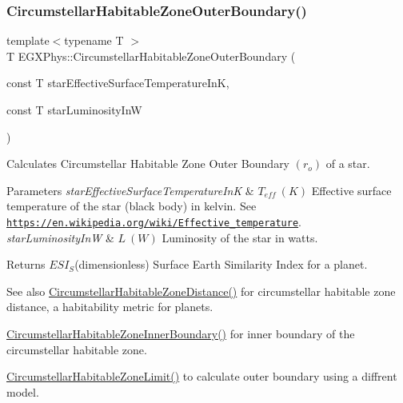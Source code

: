 \subsubsection{\texorpdfstring{Circumstellar\+Habitable\+Zone\+Outer\+Boundary()}{CircumstellarHabitableZoneOuterBoundary()}}
{\footnotesize\ttfamily template$<$typename T $>$ \\
T E\+G\+X\+Phys\+::\+Circumstellar\+Habitable\+Zone\+Outer\+Boundary (\begin{DoxyParamCaption}\item[{const T}]{star\+Effective\+Surface\+Temperature\+InK,  }\item[{const T}]{star\+Luminosity\+InW }\end{DoxyParamCaption})}



Calculates Circumstellar Habitable Zone Outer Boundary $(r_o)$ of a star. 


\begin{DoxyParams}{Parameters}
{\em star\+Effective\+Surface\+Temperature\+InK} & $T_{eff}\ (K)$ Effective surface temperature of the star (black body) in kelvin. See \href{https://en.wikipedia.org/wiki/Effective_temperature}{\tt https\+://en.\+wikipedia.\+org/wiki/\+Effective\+\_\+temperature}. \\
\hline
{\em star\+Luminosity\+InW} & $L\ (W)$ Luminosity of the star in watts. \\
\hline
\end{DoxyParams}
\begin{DoxyReturn}{Returns}
$ESI_S$(dimensionless) Surface Earth Similarity Index for a planet. 
\end{DoxyReturn}
\begin{DoxySeeAlso}{See also}
\mbox{\hyperlink{group___e_g_x_phys-_circumstellar_habitable_zone_limit_gaf289fb8f037ece66d850f7d827f83752}{Circumstellar\+Habitable\+Zone\+Distance()}} for circumstellar habitable zone distance, a habitability metric for planets. 

\mbox{\hyperlink{group___e_g_x_phys-_circumstellar_habitable_zone_limit_gab31a33d0dbd3ecd00537832b5b836d73}{Circumstellar\+Habitable\+Zone\+Inner\+Boundary()}} for inner boundary of the circumstellar habitable zone. 

\mbox{\hyperlink{group___e_g_x_phys-_circumstellar_habitable_zone_limit_ga809f4c557ce6d2fe566a69c2a8a5d41b}{Circumstellar\+Habitable\+Zone\+Limit()}} to calculate outer boundary using a diffrent model. 
\end{DoxySeeAlso}
\mbox{\label{group___e_g_x_phys-_circumstellar_habitable_zone_limit_ga0eb1003b4cfcbcafde635cefca5ae5c2}} 
